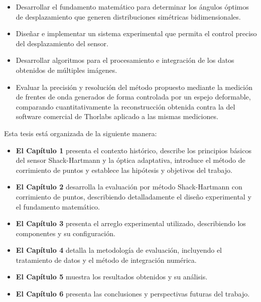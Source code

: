 \documentclass[letterpaper,12pt,oneside]{book}
\makeatletter
\renewcommand\section{\@startsection{section}{1}{\z@}{-3.5ex \@plus -1ex \@minus -.2ex}{2.3ex \@plus.2ex}{\normalfont\Large\bfseries\raggedright}}
\makeatother
\begin{document}
\begin{itemize}
	\item Desarrollar el fundamento matemático para determinar los ángulos óptimos de desplazamiento que generen distribuciones simétricas bidimensionales.
	\item Diseñar e implementar un sistema experimental que permita el control preciso del desplazamiento del sensor.
	\item Desarrollar algoritmos para el procesamiento e integración de los datos obtenidos de múltiples imágenes.
	\item Evaluar la precisión y resolución del método propuesto mediante la medición de frentes de onda generados de forma controlada por un espejo deformable, comparando cuantitativamente la reconstrucción obtenida contra la del software comercial de Thorlabs aplicado a las mismas mediciones.
\end{itemize}

\section{Estructura de la tesis}

Esta tesis está organizada de la siguiente manera:

\begin{itemize}
	\item  \textbf{El Capítulo 1} presenta el contexto histórico, describe los principios básicos del sensor Shack-Hartmann y la óptica adaptativa, introduce el método de corrimiento de puntos y establece las hipótesis y objetivos del trabajo.
	
	\item \textbf{El Capítulo 2} desarrolla la evaluación por método Shack-Hartmann con corrimiento de puntos, describiendo detalladamente el diseño experimental y el fundamento matemático.
	
	\item  \textbf{El Capítulo 3} presenta el arreglo experimental utilizado, describiendo los componentes y su configuración.
	
	\item  \textbf{El Capítulo 4} detalla la metodología de evaluación, incluyendo el tratamiento de datos y el método de integración numérica.
	
	\item \textbf{El Capítulo 5} muestra los resultados obtenidos y su análisis.
	
	\item \textbf{El Capítulo 6} presenta las conclusiones y perspectivas futuras del trabajo.
\end{itemize}
\end{document}
